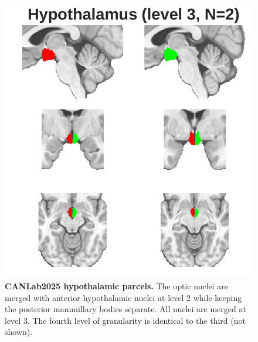 \documentclass[10pt,letterpaper]{article}
\begin{document}
\begin{figure}[t]
\begin{minipage}{0.33\linewidth}
\end{minipage}\hfill
\begin{minipage}{0.33\linewidth}
\includegraphics[width=\linewidth]{images/ht_coarser.png}
\end{minipage}\hfill
\caption{
{\bf
CANLab2025 hypothalamic parcels.} The optic nuclei are merged with anterior hypothalamic nuclei at level 2 while keeping the posterior mammillary bodies separate. All nuclei are merged at level 3. The fourth level of granularity is identical to the third (not shown).
}
\label{hypothal-granularities-figure}
\end{figure}
\end{document}
